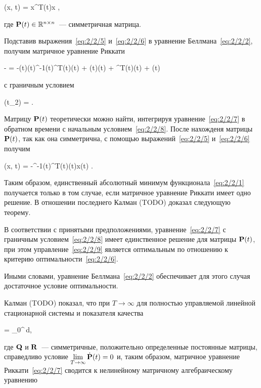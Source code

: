     \optF(x, t) =  x^T\mP(t)x \mbox{,}
\eeq

где $\mathbf{P}(t) \in \mathbb{R}^{{n} \times {n}}$~--- симметричная матрица.

Подставив выражения~\ref{eq:2/2/5} и~\ref{eq:2/2/6} в уравнение Беллмана~\ref{eq:2/2/2}, получим матричное уравнение Риккати

    -  = -\mP(t)\mB(t)\mR^{-1}(t)\mB^T(t)\mP(t) + \mP(t)\mA(t) + \mA^T(t)\mP(t) + \mQ(t)
\eeq

с граничным условием

    \mP(t_2) = \mM \mbox{.}
\eeq

Матрицу $\mathbf{P}(t)$ теоретически можно найти, интегрируя уравнение~\ref{eq:2/2/7} в обратном времени с начальным условием~\ref{eq:2/2/8}. После нахожденя матрицы $\mathbf{P}(t)$, так как она симметрична, с помощью выражений~\vref{eq:2/2/5} и~\ref{eq:2/2/6} получим

    \optU(x, t) = -\mR^{-1}(t)\mB^T(t)\mP(t)x(t) \mbox{.}
\eeq

Таким образом, единственный абсолютный минимум функционала~\vref{eq:2/2/1} получается только в том случае, если матричное уравнение Риккати имеет одно решение. В отношении последнего Калман (TODO) доказал следующую теорему.

\begin{teo}
    В соответствии с принятыми предположениями, уравнение~\ref{eq:2/2/7} с граничным условием~\ref{eq:2/2/8} имеет единственное решение для матрицы $\mathbf{P}(t)$, при этом управление~\ref{eq:2/2/9} является оптимальным по отношению к критерию оптимальности~\vref{eq:2/2/6}.
\end{teo}

Иными словами, уравнение Беллмана~\vref{eq:2/2/2} обеспечивает для этого случая достаточное условие оптимальности.


\br

Калман (TODO) показал, что при $T \to \infty$ для полностью управляемой линейной стационарной системы и показателя качества

\beqn
    \funcF =  \int\limits_0^\infty {}\,d\tau \mbox{,}
\eeqn

где $\mathbf{Q}$ и $\mathbf{R}$~--- симметричные, положительно определенные постоянные матрицы, справедливо условие $\lim\limits_{T \to \infty}\dot{\mathbf{P}}(t) = 0$ и, таким образом, матричное уравнение Риккати~\ref{eq:2/2/7} сводится к нелинейному матричному алгебраическому уравнению

